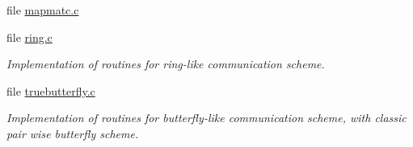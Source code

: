 \begin{DoxyCompactItemize}
file \hyperlink{mapmatc_8c}{mapmatc.\-c}
\item 
file \hyperlink{ring_8c}{ring.\-c}
\begin{DoxyCompactList}\small\item\em Implementation of routines for ring-\/like communication scheme. \end{DoxyCompactList}\item 
file \hyperlink{truebutterfly_8c}{truebutterfly.\-c}
\begin{DoxyCompactList}\small\item\em Implementation of routines for butterfly-\/like communication scheme, with classic pair wise butterfly scheme. \end{DoxyCompactList}\end{DoxyCompactItemize}
